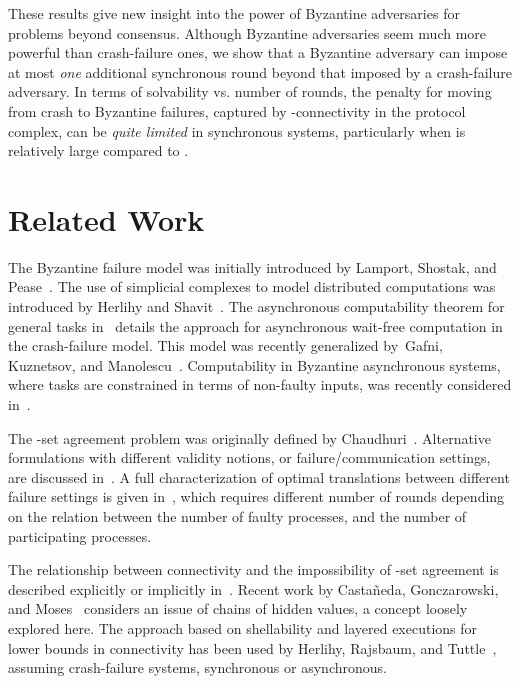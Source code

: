 \documentclass[11pt]{article}
\begin{document}
These results give new insight into the power of Byzantine
adversaries for problems beyond consensus.
Although Byzantine adversaries seem much more powerful than
crash-failure ones,
we show that a Byzantine adversary can impose at most \emph{one} additional
synchronous round beyond that imposed by a crash-failure adversary.
In terms of solvability vs. number of rounds,
the penalty for moving from crash to Byzantine failures,
captured by -connectivity in the protocol complex,
can be \emph{quite limited} in synchronous systems,
particularly when  is relatively large compared to .

\section{Related Work}
\label{Sec-RelatedWork}

The Byzantine failure model was initially introduced by Lamport,
Shostak, and Pease~\cite{Lamport1982}.
The use of simplicial complexes to model distributed computations
was introduced by Herlihy and Shavit~\cite{HerlihyShavit1993}.
The asynchronous computability theorem for general tasks in~\cite{HerlihyShavit1999}
details the approach for asynchronous wait-free computation in the
crash-failure model.
This model was recently generalized by~Gafni, Kuznetsov, and Manolescu~\cite{GACT2014}.
Computability in Byzantine asynchronous systems,
where tasks are constrained in terms of non-faulty inputs,
was recently considered in~\cite{MendesHerlihy14}.

The -set agreement problem was originally defined by Chaudhuri~\cite{ksetagreement}.
Alternative formulations with
different validity notions, or failure/communication settings,
are discussed in~\cite{Neiger93,dePriscoMR2001}.
A full characterization of optimal translations between different failure settings
is given in~\cite{BazziNeiger01,NeigerToueg90},
which requires different number of rounds depending on the relation between
the number of faulty processes,
and the number of participating processes.

The relationship between connectivity and the impossibility of -set agreement
is described explicitly or implicitly in~\cite{ChaudhuriHLT2000,HerlihyShavit1999,SaksZ1993}.
Recent work by Castañeda, Gonczarowski, and Moses~\cite{CastaMosesBA2013}
considers an issue of chains of hidden values,
a concept loosely explored here.
The approach based on shellability and layered executions for lower bounds in connectivity
has been used by Herlihy, Rajsbaum, and Tuttle~\cite{HerlihyRT98,HerlihyRT09,ConcurrentShellable},
assuming crash-failure systems, synchronous or asynchronous.
\end{document}
